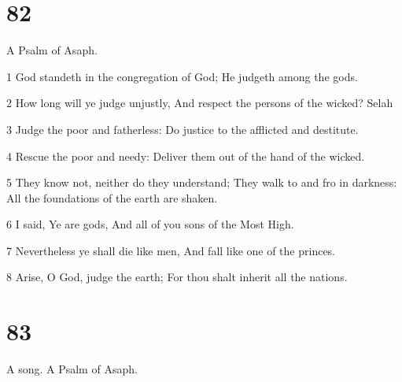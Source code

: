\chapter{82}

\par A Psalm of Asaph.

\par 1 God standeth in the congregation of God; He judgeth among the gods.
\par 2 How long will ye judge unjustly, And respect the persons of the wicked? Selah
\par 3 Judge the poor and fatherless: Do justice to the afflicted and destitute.
\par 4 Rescue the poor and needy: Deliver them out of the hand of the wicked.
\par 5 They know not, neither do they understand; They walk to and fro in darkness: All the foundations of the earth are shaken.
\par 6 I said, Ye are gods, And all of you sons of the Most High.
\par 7 Nevertheless ye shall die like men, And fall like one of the princes.
\par 8 Arise, O God, judge the earth; For thou shalt inherit all the nations.

\chapter{83}

\par A song. A Psalm of Asaph.

